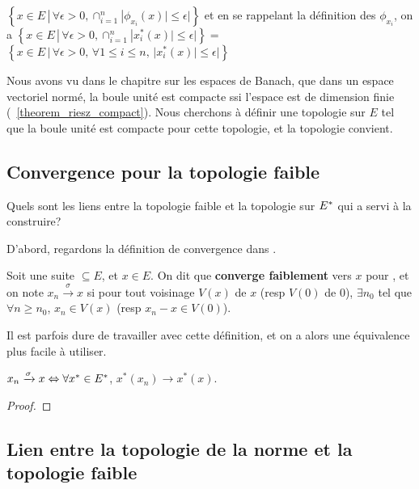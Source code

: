 $\left\{ x \in E \, | \, \forall \epsilon > 0, \cap_{i = 1}^{n}|\phi_{x_{i}}(x)| \leq \epsilon| \right\}$
et en se rappelant la définition des $\phi_{x_{i}}$, on a 
$\left\{ x \in E \, | \, \forall \epsilon > 0, \cap_{i = 1}^{n}|x_{i}^{*}(x)| \leq
\epsilon| \right\} = $
$\left\{ x \in E \, | \, \forall \epsilon > 0, \, \forall 1 \leq i \leq n, \, |x_{i}^{*}(x)| \leq \epsilon| \right\}$

Nous avons vu dans le chapitre sur les espaces de Banach, que dans un espace
vectoriel normé, la boule unité est compacte ssi l'espace est de dimension
finie (~\ref{theorem_riesz_compact}). Nous cherchons à définir une topologie sur
$E$ tel que la boule unité est compacte pour cette topologie, et la topologie
 convient.

\subsection{Convergence pour la topologie faible}
Quels sont les liens entre la topologie faible et la topologie sur $E^{*}$
qui a servi à la construire?

D'abord, regardons la définition de convergence dans .
\begin{definition}
	Soit une suite  $\subseteq E$, et $x \in E$.
	On dit que  \textbf{converge faiblement} vers $x$
	pour , et on note $x_{n} \xrightarrow{\sigma} x$ si pour tout
	voisinage $V(x)$ de $x$ (resp $V(0)$ de $0$), $\exists n_{0}$ tel que
	$\forall n \geq n_{0}$, $x_{n} \in V(x)$ (resp $x_{n} - x \in V(0)$).
\end{definition}

Il est parfois dure de travailler avec cette définition, et on a alors une
équivalence plus facile à utiliser.

\begin{proposition}
	$x_{n} \xrightarrow{\sigma} x \Leftrightarrow \forall x^{*} \in E^{*}$,
	$x^{*}(x_{n}) \rightarrow x^{*}(x)$.
\end{proposition}

\begin{proof}
	
\end{proof}

\subsection{Lien entre la topologie de la norme et la topologie faible}

